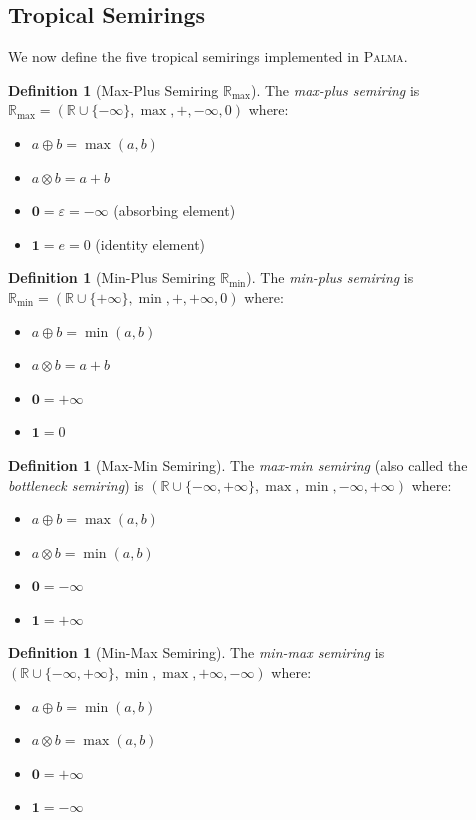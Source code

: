 \documentclass[11pt,a4paper]{article}
\theoremstyle{plain}
\theoremstyle{definition}
\newtheorem{definition}[theorem]{Definition}
\newcommand{\palma}{\textsc{Palma}}
\newcommand{\Rmax}{\mathbb{R}_{\max}}
\newcommand{\Rmin}{\mathbb{R}_{\min}}
\begin{document}
\subsection{Tropical Semirings}
\label{subsec:tropical-semirings}

We now define the five tropical semirings implemented in \palma{}.

\begin{definition}[Max-Plus Semiring $\Rmax$]
\label{def:max-plus}
The \emph{max-plus semiring} is $\Rmax = (\mathbb{R} \cup \{-\infty\}, \max, +, -\infty, 0)$ where:
\begin{itemize}
    \item $a \oplus b = \max(a, b)$
    \item $a \otimes b = a + b$
    \item $\mathbf{0} = \varepsilon = -\infty$ (absorbing element)
    \item $\mathbf{1} = e = 0$ (identity element)
\end{itemize}
\end{definition}

\begin{definition}[Min-Plus Semiring $\Rmin$]
\label{def:min-plus}
The \emph{min-plus semiring} is $\Rmin = (\mathbb{R} \cup \{+\infty\}, \min, +, +\infty, 0)$ where:
\begin{itemize}
    \item $a \oplus b = \min(a, b)$
    \item $a \otimes b = a + b$
    \item $\mathbf{0} = +\infty$
    \item $\mathbf{1} = 0$
\end{itemize}
\end{definition}

\begin{definition}[Max-Min Semiring]
\label{def:max-min}
The \emph{max-min semiring} (also called the \emph{bottleneck semiring}) is $(\mathbb{R} \cup \{-\infty, +\infty\}, \max, \min, -\infty, +\infty)$ where:
\begin{itemize}
    \item $a \oplus b = \max(a, b)$
    \item $a \otimes b = \min(a, b)$
    \item $\mathbf{0} = -\infty$
    \item $\mathbf{1} = +\infty$
\end{itemize}
\end{definition}

\begin{definition}[Min-Max Semiring]
\label{def:min-max}
The \emph{min-max semiring} is $(\mathbb{R} \cup \{-\infty, +\infty\}, \min, \max, +\infty, -\infty)$ where:
\begin{itemize}
    \item $a \oplus b = \min(a, b)$
    \item $a \otimes b = \max(a, b)$
    \item $\mathbf{0} = +\infty$
    \item $\mathbf{1} = -\infty$
\end{itemize}
\end{definition}
\end{document}
